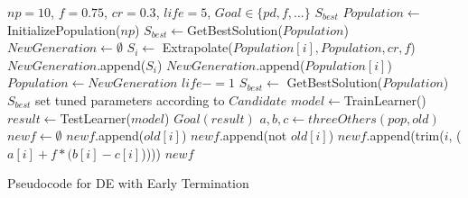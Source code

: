 \documentclass[sigconf,review, anonymous]{acmart}
\theoremstyle{break}
\begin{document}
\begin{algorithm}[!htp]

\scriptsize
\begin{algorithmic}[1]
\Require $\mathit{np} = 10$, $f=0.75$, $cr=0.3$, $\mathit{life} = 5$, $\mathit{Goal} \in \{\mathit{pd},f,...\}$
\Ensure $\mathit{S_{best}}$
\vspace{2mm}
 \State $\mathit{Population}  \gets $ InitializePopulation($\mathit{np}$)   
 \State $\mathit{S_{best}} \gets $GetBestSolution($\mathit{Population}$)
    \State $NewGeneration \gets \emptyset$
        \State $\mathit{S_i} \gets$ Extrapolate($\mathit{Population [i], Population , cr, f}$)
            \State $\mathit{NewGeneration}$.append($\mathit{S_i}$)
        \Else
        \State $\mathit{NewGeneration}$.append($\mathit{Population [i]}$)
        \EndIf
    \EndFor
    \State $\mathit{Population  \gets NewGeneration}$
        \State $\mathit{life -=1}$
    \EndIf
    \State $\mathit{S_{best} }\gets$ GetBestSolution($\mathit{Population} $)
 \EndWhile
\State \Return $\mathit{S_{best}}$
\EndFunction
{}
  \State set tuned parameters according to $\mathit{Candidate}$
  \State $\mathit{model} \gets$TrainLearner()
  \State $\mathit{result} \gets$TestLearner($\mathit{model}$)   
  \State \Return$\mathit{Goal}(\mathit{result})$  
\EndFunction
{}
  \State $\mathit{a, b, c}\gets threeOthers(\mathit{pop,old})$  
  \State $\mathit{newf }\gets \emptyset$
            \State $\mathit{newf}$.append($\mathit{old[i]}$)
        \Else
                \State $\mathit{newf}$.append(not $\mathit{old[i]}$)
            \Else
                \State $\mathit{newf}$.append(trim($i$, ($\mathit{a[i]+f*(b[i]-c[i]}$)))) 
         \EndIf
      \EndIf
  \EndFor
 \State \Return $\mathit{newf}$
\EndFunction
\end{algorithmic} 
\caption{Pseudocode for DE with Early Termination}
\label{alg:DE}
\end{algorithm}



\end{document}
